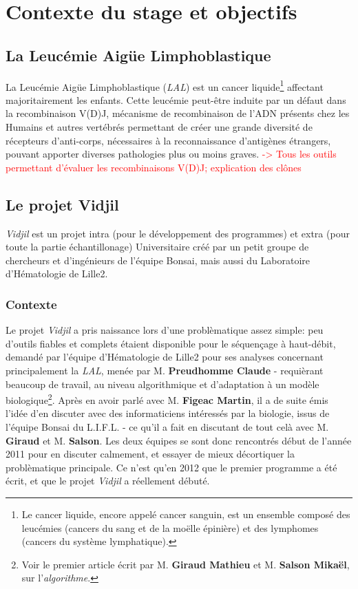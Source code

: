 \documentclass{report}
\begin{document}
\chapter{Contexte du stage et objectifs}

\section{La Leucémie Aigüe Limphoblastique}
La Leucémie Aigüe Limphoblastique (\textit{LAL}) est un cancer liquide\footnote{Le cancer liquide, encore appelé cancer sanguin, est un ensemble composé des leucémies (cancers du sang et de la moëlle épinière) et des lymphomes (cancers du système lymphatique).} affectant majoritairement les enfants.
\newline
Cette leucémie peut-être induite par un défaut dans la recombinaison V(D)J, mécanisme de recombinaison de l'ADN présents chez les Humains et autres vertébrés permettant de créer une grande diversité de récepteurs d'anti-corps, nécessaires à la reconnaissance d'antigènes étrangers, pouvant apporter diverses pathologies plus ou moins graves.
\newline
\textcolor{red}{-> Tous les outils permettant d'évaluer les recombinaisons V(D)J; explication des clônes}

\section{Le projet Vidjil}

\textit{Vidjil} est un projet intra (pour le développement des programmes) et extra (pour toute la partie échantillonage) Universitaire créé par un petit groupe de chercheurs et d'ingénieurs de l'équipe Bonsai, mais aussi du Laboratoire d'Hématologie de Lille2.
\subsection{Contexte}
Le projet \textit{Vidjil} a pris naissance lors d'une problèmatique assez simple: peu d'outils fiables et complets étaient disponible pour le séquençage à haut-débit, demandé par l'équipe d'Hématologie de Lille2 pour ses analyses concernant principalement la \textit{LAL}, menée par M. \textbf{Preudhomme Claude} - requièrant beaucoup de travail, au niveau algorithmique et d'adaptation à un modèle biologique\footnote{Voir le premier article écrit par M. \textbf{Giraud Mathieu} et M. \textbf{Salson Mikaël}, sur l'\textit{algorithme}.}.
\newline
Après en avoir parlé avec M. \textbf{Figeac Martin}, il a de suite émis l'idée d'en discuter avec des informaticiens intéressés par la biologie, issus de l'équipe Bonsai du L.I.F.L. - ce qu'il a fait en discutant de tout celà avec M. \textbf{Giraud} et M. \textbf{Salson}.
\newline
Les deux équipes se sont donc rencontrés début de l'année 2011 pour en discuter calmement, et essayer de mieux décortiquer la problèmatique principale. Ce n'est qu'en 2012 que le premier programme a été écrit, et que le projet \textit{Vidjil} a réellement débuté.
\end{document}
